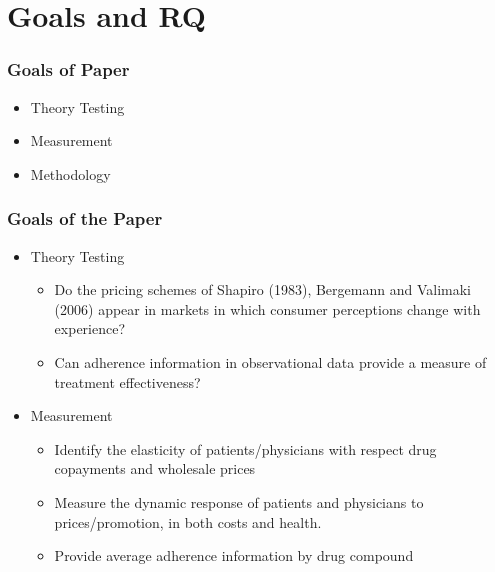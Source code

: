 \documentclass[aspectratio=169,11pt]{beamer}
\begin{document}

\section{Goals and RQ}


\begin{frame}
\frametitle{Goals of Paper}

\begin{itemize}
\item Theory Testing

\item Measurement

\item Methodology
\end{itemize}
\end{frame}


\begin{frame}
\frametitle{Goals of the Paper}

\begin{itemize}
\item Theory Testing

\begin{itemize}
\item Do the pricing schemes of Shapiro (1983), Bergemann and Valimaki
(2006) appear in markets in which consumer perceptions change with
experience?

\item Can adherence information in observational data provide a measure of
treatment effectiveness?
\end{itemize}

\item Measurement

\begin{itemize}
\item Identify the elasticity of patients/physicians with respect drug
copayments and wholesale prices

\item Measure the dynamic response of patients and physicians to
prices/promotion, in both costs and health.

\item Provide average adherence information by drug compound
\end{itemize}
\end{itemize}
\end{frame}
\end{document}
